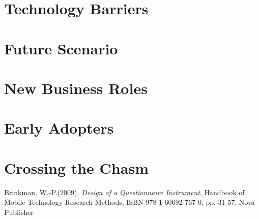 \documentclass[a4paper]{article}
\begin{document}
\section{Technology Barriers}
\label{sec:technology-barriers}

\section{Future Scenario}
\label{sec:future-scenario}

\section{New Business Roles}
\label{sec:new-business-roles}

\section{Early Adopters}
\label{sec:early-adopters}

\section{Crossing the Chasm}
\label{sec:crossing-the-chasm}


\begin{thebibliography}{9}
  Brinkman, W.-P.(2009). \emph{Design of a Questionnaire Instrument}, Handbook of Mobile Technology Research Methods, ISBN 978-1-60692-767-0, pp. 31-57, Nova Publisher

\end{thebibliography}
\end{document}
